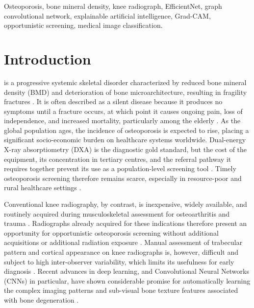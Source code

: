 \documentclass[journal]{IEEEtran}
\begin{document}
\begin{IEEEkeywords}
Osteoporosis, bone mineral density, knee radiograph, EfficientNet, graph
convolutional network, explainable artificial intelligence, Grad-CAM,
opportunistic screening, medical image classification.
\end{IEEEkeywords}

\section{Introduction} \label{Introduction}
 is a progressive systemic skeletal disorder
characterized by reduced bone mineral density (BMD) and deterioration of bone
microarchitecture, resulting in fragility fractures \cite{lorentzon2022osteoporosis}.
It is often described as a silent disease because it produces no symptoms
until a fracture occurs, at which point it causes ongoing pain, loss of
independence, and increased mortality, particularly among the elderly
\cite{salari2021global}. As the global population ages, the incidence of
osteoporosis is expected to rise, placing a significant socio-economic burden
on healthcare systems worldwide. Dual-energy X-ray absorptiometry (DXA) is the
diagnostic gold standard, but the cost of the equipment, its concentration in
tertiary centres, and the referral pathway it requires together prevent its use
as a population-level screening tool \cite{hui2025deep}. Timely osteoporosis
screening therefore remains scarce, especially in resource-poor and rural
healthcare settings \cite{auriat2026evaluating}.

Conventional knee radiography, by contrast, is inexpensive, widely available,
and routinely acquired during musculoskeletal assessment for osteoarthritis and
trauma \cite{wani2023osteoporosis}. Radiographs already acquired for these
indications therefore present an opportunity for opportunistic osteoporosis
screening without additional acquisitions or additional radiation exposure
\cite{hui2025deep}. Manual assessment of trabecular pattern and cortical
appearance on knee radiographs is, however, difficult and subject to high
inter-observer variability, which limits its usefulness for early diagnosis
\cite{wani2023osteoporosis}. Recent advances in deep learning, and Convolutional
Neural Networks (CNNs) in particular, have shown considerable promise for
automatically learning the complex imaging patterns and sub-visual bone texture
features associated with bone degeneration
\cite{sukegawa2022identification,wani2023osteoporosis}.
\end{document}
